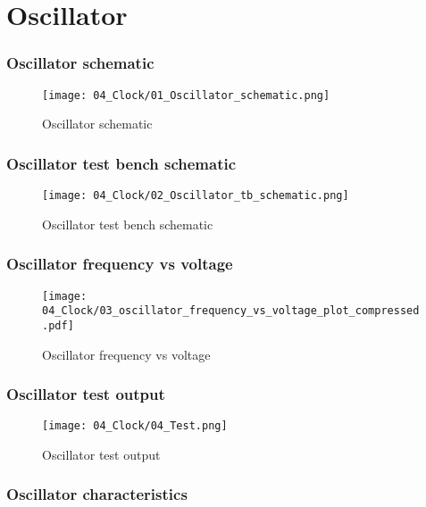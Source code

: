 \documentclass[xcolor=dvipsnames,envcountsect]{beamer}
\begin{document}
\section{Oscillator}
\begin{frame}
	\frametitle{Oscillator schematic}
	\begin{figure}[ht]
		\centering
		\texttt{[image: 04\_Clock/01\_Oscillator\_schematic.png]}
		\caption{Oscillator schematic}
	\end{figure}
\end{frame}

\begin{frame}
	\frametitle{Oscillator test bench schematic}
	\begin{figure}[ht]
		\centering
		\texttt{[image: 04\_Clock/02\_Oscillator\_tb\_schematic.png]}
		\caption{Oscillator test bench schematic}
	\end{figure}
\end{frame}

\begin{frame}
	\frametitle{Oscillator frequency vs voltage}
	\begin{figure}[ht]
		\centering
		\texttt{[image: 04\_Clock/03\_oscillator\_frequency\_vs\_voltage\_plot\_compressed.pdf]}
		\caption{Oscillator frequency vs voltage}
	\end{figure}
\end{frame}

\begin{frame}
	\frametitle{Oscillator test output}
	\begin{figure}[ht]
		\centering
		\texttt{[image: 04\_Clock/04\_Test.png]}
		\caption{Oscillator test output}
	\end{figure}
\end{frame}


\begin{frame}
	\frametitle{Oscillator characteristics}
	\begin{figure}[ht]
		\centering
	\end{figure}
\end{frame}
\end{document}
